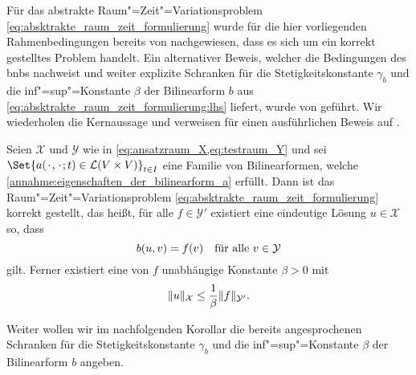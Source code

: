 \documentclass[../main.tex]{subfiles}
\begin{document}
Für das abstrakte Raum"=Zeit"=Variationsproblem \cref{eq:absktrakte_raum_zeit_formulierung} wurde für die hier vorliegenden Rahmenbedingungen bereits von \textcite[Section XVIII.3]{Dautray:1992by} nachgewiesen, dass es sich um ein korrekt gestelltes Problem handelt.
Ein alternativer Beweis, welcher die Bedingungen des \acl{bnb}s nachweist und weiter explizite Schranken für die Stetigkeitskonstante $\gamma_{b}$ und die inf"=sup"=Konstante $\beta$ der Bilinearform $b$ aus \cref{eq:absktrakte_raum_zeit_formulierung:lhs} liefert, wurde von \textcite{Schwab:2009ec} geführt.
Wir wiederholen die Kernaussage \cite[Theorem 5.1]{Schwab:2009ec} und verweisen für einen ausführlichen Beweis auf \cite[Appendix A]{Schwab:2009ec}.

\begin{Satz}
\label{satz:ss09:theorem51}
    Seien $\mathcal X$ und $\mathcal Y$ wie in \cref{eq:ansatzraum_X,eq:testraum_Y} und sei $\Set{a(\blank, \blank; t) \in \mathcal L (V \times V)}_{t \in I}$ eine Familie von Bilinearformen, welche \cref{annahme:eigenschaften_der_bilinearform_a} erfüllt.
    Dann ist das Raum"=Zeit"=Variationsproblem \cref{eq:absktrakte_raum_zeit_formulierung} korrekt gestellt, das heißt, für alle $f \in \mathcal Y'$ existiert eine eindeutige Lösung $u \in \mathcal X$ so, dass
    \begin{equation}
        b(u, v) = f(v) \quad \fa v \in \mathcal Y
    \end{equation}
    gilt.
    Ferner existiert eine von $f$ unabhängige Konstante $\beta > 0$ mit
    \begin{equation}
        \norm{u}_{\mathcal X} \leq \frac{1}{\beta} \norm{f}_{\mathcal Y'}.
    \end{equation}
\end{Satz}

Weiter wollen wir im nachfolgenden Korollar die bereits angesprochenen Schranken für die Stetigkeitskonstante $\gamma_{b}$ und die inf"=sup"=Konstante $\beta$ der Bilinearform $b$ angeben.
\end{document}
